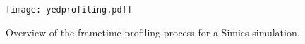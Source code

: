 
\begin{figure}
\centering

\texttt{[image: yedprofiling.pdf]}

\caption[Profiling process overview]{Overview of the frametime profiling process for a Simics simulation.}
\label{fig:profilingsimics}

\end{figure}
